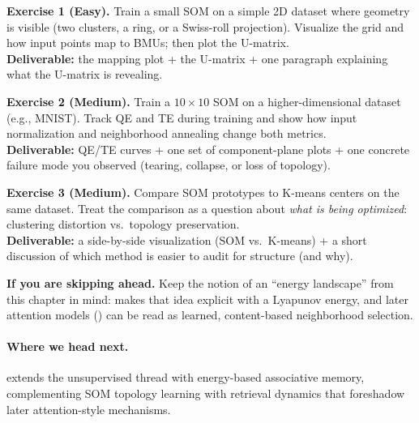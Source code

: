 \begin{tcolorbox}[summarybox, title={Exercises}]
\textbf{Exercise 1 (Easy).} Train a small SOM on a simple 2D dataset where geometry is visible (two clusters, a ring, or a Swiss-roll projection). Visualize the grid and how input points map to BMUs; then plot the U\hyp{}matrix. \\
\textbf{Deliverable:} the mapping plot + the U\hyp{}matrix + one paragraph explaining what the U\hyp{}matrix is revealing.

\smallskip
\textbf{Exercise 2 (Medium).} Train a \(10\times 10\) SOM on a higher-dimensional dataset (e.g., MNIST). Track QE and TE during training and show how input normalization and neighborhood annealing change both metrics. \\
\textbf{Deliverable:} QE/TE curves + one set of component-plane plots + one concrete failure mode you observed (tearing, collapse, or loss of topology).

\smallskip
\textbf{Exercise 3 (Medium).} Compare SOM prototypes to K\hyp{}means centers on the same dataset. Treat the comparison as a question about \emph{what is being optimized}: clustering distortion vs.\ topology preservation. \\
\textbf{Deliverable:} a side-by-side visualization (SOM vs.\ K\hyp{}means) + a short discussion of which method is easier to audit for structure (and why).

\par\medskip
\noindent\textbf{If you are skipping ahead.} Keep the notion of an ``energy landscape'' from this chapter in mind:  makes that idea explicit with a Lyapunov energy, and later attention models () can be read as learned, content-based neighborhood selection.
\end{tcolorbox}

\medskip
\paragraph{Where we head next.}  extends the unsupervised thread with energy-based associative memory, complementing SOM topology learning with retrieval dynamics that foreshadow later attention-style mechanisms.
